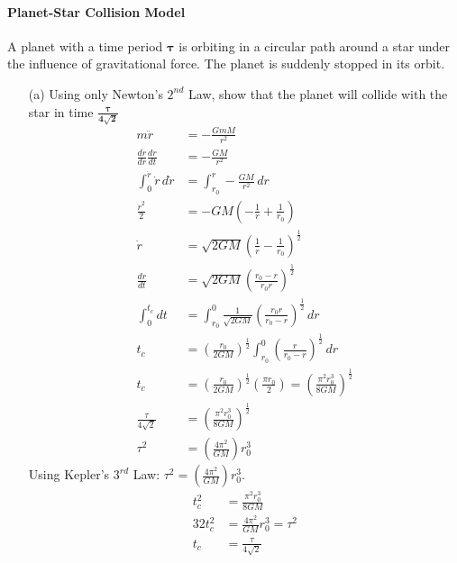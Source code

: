 \documentclass[]{article}
\begin{document}
{		\paragraph{Planet-Star Collision Model} A planet with a time period $\bm{\tau}$ is orbiting in a circular path around a star under the influence of gravitational force. The planet is suddenly stopped in its orbit.
		\begin{enumerate}
			\item[(a)] Using only Newton's $2^{nd}$ Law, show that the planet will collide with the star in time $\bm{\frac{\tau}{4\sqrt{2}}}$
				\begin{equation*}
					\begin{split}
						m\ddot{r} &= -\frac{GmM}{r^2} \\
						\frac{d\dot{r}}{dr} \frac{dr}{dt} &= -\frac{GM}{r^2} \\
						\int_{0}^{\dot{r}} \dot{r} \, d\dot{r} &= \int_{r_0}^{r} -\frac{GM}{r^2} \, dr \\
						\frac{\dot{r}^2}{2} &= -GM \left( - \frac{1}{r} + \frac{1}{r_0} \right) \\
						\dot{r} &= \sqrt{2GM} \left( \frac{1}{r} - \frac{1}{r_0} \right)^{\frac{1}{2}} \\
						\frac{dr}{dt} &= \sqrt{2GM} \left( \frac{r_0 - r}{r_0 r} \right)^{\frac{1}{2}} \\
						\int_{0}^{t_c} dt &= \int_{r_0}^{0} \frac{1}{\sqrt{2GM}} \left( \frac{r_0 r}{r_0 - r} \right)^{\frac{1}{2}} \, dr \\
						t_c &= \left( \frac{r_0}{2GM} \right)^{\frac{1}{2}} \int_{r_0}^{0}  \left( \frac{r}{r_0 - r} \right)^{\frac{1}{2}} \, dr \\
						t_c &= \left( \frac{r_0}{2GM} \right)^{\frac{1}{2}} \left( \frac{\pi r_0}{2} \right) = \left( \frac{\pi^2 r_0^3}{8GM} \right)^{\frac{1}{2}} \\
						\frac{\tau}{4\sqrt{2}} &= \left( \frac{\pi^2 r_0^3}{8GM} \right)^{\frac{1}{2}} \\ 
						\tau^2 &= \left( \frac{4\pi^2}{GM} \right) r_0^3
					\end{split}
				\end{equation*}
				Using Kepler's $3^{rd}$ Law: $\tau^2 = \left( \frac{4\pi^2}{GM} \right) r_0^3$.
				\begin{equation*}
					\begin{split}
						t_c^2 &= \frac{\pi^2 r_0^3}{8GM} \\
						32 t_c^2 &= \frac{4\pi^2}{GM} r_0^3 = \tau^2 \\
						t_c &= \frac{\tau}{4 \sqrt{2}} \\
					\end{split}
				\end{equation*}
			

\end{enumerate}}
\end{document}
